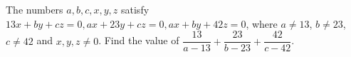 The numbers $a, b, c, x, y, z$ satisfy $13x+by+cz=0, ax+23y+cz=0, ax+by+42z=0$, where $a\neq13$, $b\neq23$, $c\neq42$ and $x, y, z\neq0$. Find the value of $\dfrac{13}{a-13}+\dfrac{23}{b-23}+\dfrac{42}{c-42}$.
